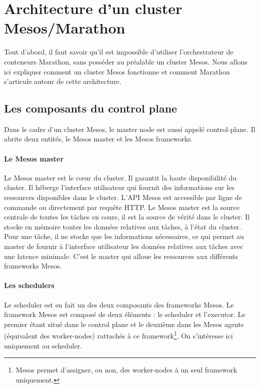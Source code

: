 \documentclass[11pt,fleqn]{book} %
\begin{document}
\section*{Architecture d'un cluster Mesos/Marathon}
Tout d'abord, il faut savoir qu'il est impossible d'utiliser l'orchestrateur de conteneurs Marathon, sans posséder au préalable un cluster Mesos. Nous allons ici expliquer comment un cluster Mesos fonctionne et comment Marathon s'articule autour de cette architecture.



\subsection*{Les composants du control plane}
Dans le cadre d'un cluster Mesos, le master node est aussi appelé control-plane. Il abrite deux entités, le Mesos master et les Mesos frameworks.
\paragraph*{Le Mesos master}
Le Mesos master est le cœur du cluster. Il garantit la haute disponibilité du cluster. Il héberge l'interface utilisateur qui fournit des informations sur les ressources disponibles dans le cluster. L'API Mesos est accessible par ligne de commande ou directement par requête HTTP. Le Mesos master est la source centrale de toutes les tâches en cours, il est la source de vérité dans le cluster. Il stocke en mémoire toutes les données relatives aux tâches, à l'état du cluster. Pour une tâche, il ne stocke que les informations nécessaires, ce qui permet au master de fournir à l'interface utilisateur les données relatives aux tâches avec une latence minimale. C'est le master qui alloue les ressources aux différents frameworks Mesos.

\paragraph*{Les schedulers}
Le scheduler est en fait un des deux composants des frameworks Mesos. Le framework Mesos est composé de deux éléments : le scheduler et l'executor. Le premier étant situé dans le control plane et le deuxième dans les Mesos agents (équivalent des worker-nodes) rattachés à ce framework\footnote{Mesos permet d'assigner, ou non, des worker-nodes à un seul framework uniquement.}. On s'intéresse ici uniquement au scheduler. \\
\end{document}
